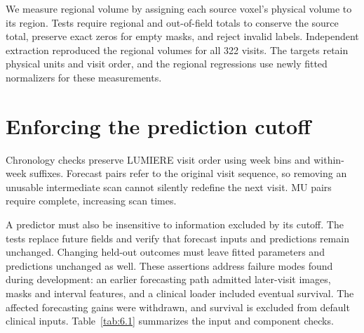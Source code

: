We measure regional volume by assigning each source voxel's physical volume to its region. Tests require regional and out-of-field totals to conserve the source total, preserve exact zeros for empty masks, and reject invalid labels. Independent extraction reproduced the regional volumes for all 322 visits. The targets retain physical units and visit order, and the regional regressions use newly fitted normalizers for these measurements.

\section{Enforcing the prediction cutoff}

Chronology checks preserve LUMIERE visit order using week bins and within-week suffixes. Forecast pairs refer to the original visit sequence, so removing an unusable intermediate scan cannot silently redefine the next visit. MU pairs require complete, increasing scan times.

A predictor must also be insensitive to information excluded by its cutoff. The tests replace future fields and verify that forecast inputs and predictions remain unchanged. Changing held-out outcomes must leave fitted parameters and predictions unchanged as well. These assertions address failure modes found during development: an earlier forecasting path admitted later-visit images, masks and interval features, and a clinical loader included eventual survival. The affected forecasting gains were withdrawn, and survival is excluded from default clinical inputs. Table~\ref{tab:6.1} summarizes the input and component checks.

